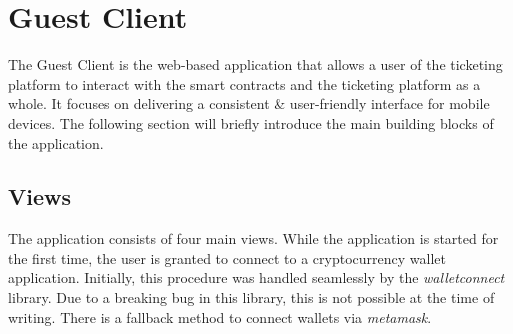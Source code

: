 
\section{Guest Client}\label{section:guest client}
The Guest Client is the web-based application that allows a user of the ticketing platform to interact with the smart contracts and the ticketing platform as a whole. It focuses on delivering a consistent \& user-friendly interface for mobile devices. The following section will briefly introduce the main building blocks of the application.

\subsection{Views}

The application consists of four main views. While the application is started for the first time, the user is granted to connect to a cryptocurrency wallet application. Initially, this procedure was handled seamlessly by the \textit{walletconnect} library. Due to a breaking bug in this library, this is not possible at the time of writing. There is a fallback method to connect wallets via \textit{metamask}.

